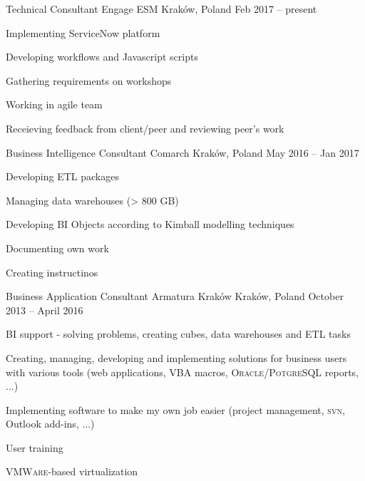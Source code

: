 \begin{cventries}
	\cventry
		{Technical Consultant}
		{Engage ESM}
		{Kraków, Poland}
		{Feb 2017 -- present}
		{
			\begin{cvitems}
				\item {Implementing ServiceNow platform}
				\item {Developing workflows and Javascript scripts}
				\item {Gathering requirements on workshops}
				\item {Working in agile team}
				\item {Receieving feedback from client/peer and reviewing peer's work}
			\end{cvitems}
		}
	\cventry
		{Business Intelligence Consultant}
		{Comarch}
		{Kraków, Poland}
		{May 2016 -- Jan 2017}
		{
			\begin{cvitems}
				\item {Developing ETL packages}
				\item {Managing data warehouses (> 800 GB)}
				\item {Developing BI Objects according to Kimball modelling techniques}
				\item {Documenting own work}
				\item {Creating instructinos}
			\end{cvitems}
		}
	\cventry
		{Business Application Consultant}
		{Armatura Kraków}
		{Kraków, Poland}
		{October 2013 -- April 2016}
		{
			\begin{cvitems}
				\item {BI support - solving problems, creating cubes, data warehouses and \textsc{ETL} tasks}
				\item {Creating, managing, developing and implementing solutions for business users with various tools (web applications, \textsc{VBA} macros, \textsc{Oracle}/\textsc{PotgreSQL} reports, ...)}
				\item {Implementing software to make my own job easier (project management, \textsc{svn}, Outlook add-ins, ...)}
				\item {User training}
				\item {\textsc{VMWare}-based virtualization}

\end{cvitems}}
\end{cventries}
